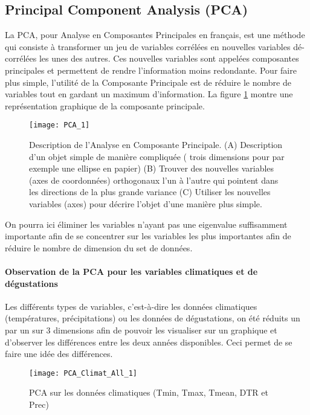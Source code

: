 \subsection{Principal Component Analysis (PCA)}\label{PCAss}
La PCA, pour Analyse en Composantes Principales en français, est une méthode qui consiste à transformer un jeu de variables corrélées en nouvelles variables dé-corrélées les unes des autres. Ces nouvelles variables sont appelées composantes principales et permettent de rendre l'information moins redondante. Pour faire plus simple, l'utilité de la Composante Principale est de réduire le nombre de variables tout en gardant un maximum d'information. La figure \ref{PCAdefinition} montre une représentation graphique de la composante principale. 


\begin{figure}[H]
	\texttt{[image: PCA\_1]}
	\caption{\label{PCAdefinition} Description de l'Analyse en Composante Principale. (A) Description d'un objet simple de manière compliquée ( trois dimensions pour par exemple une ellipse en papier) (B) Trouver des nouvelles variables (axes de coordonnées) orthogonaux l'un à l'autre qui pointent dans les directions de la plus grande variance (C) Utiliser les nouvelles variables (axes) pour décrire l'objet d'une manière plus simple. }
\end{figure}

\noindent On pourra ici éliminer les variables n'ayant pas une eigenvalue suffisamment importante afin de se concentrer sur les variables les plus importantes afin de réduire le nombre de dimension du set de données. 





\paragraph{Observation de la PCA pour les variables climatiques et de dégustations} Les différents types de variables, c'est-à-dire les données climatiques (températures, précipitations) ou les données de dégustations, on été réduits un par un sur 3 dimensions afin de pouvoir les visualiser sur un graphique et d'observer les différences entre les deux années disponibles. Ceci permet de se faire une idée des différences.  

\begin{figure}[H]
	\texttt{[image: PCA\_Climat\_All\_1]}
	\caption{\label{PCAClimatAll} PCA sur les données climatiques (Tmin, Tmax, Tmean, DTR et Prec) }
\end{figure}

